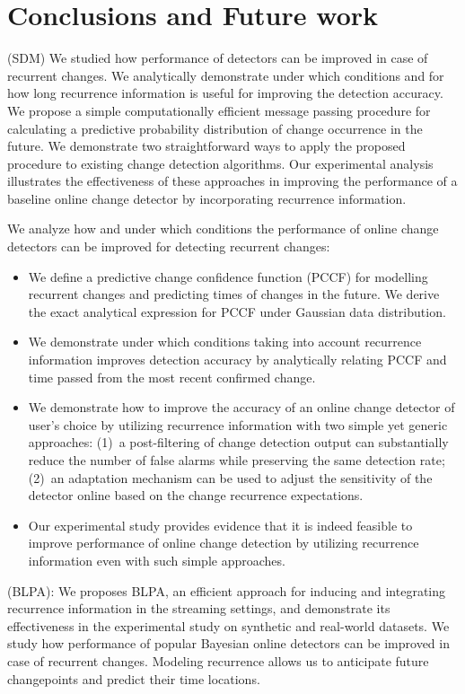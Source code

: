\chapter{Conclusions and Future work}

(SDM) We studied how performance of detectors can be improved in case of recurrent changes.
We analytically demonstrate under which conditions and for how long recurrence information is useful for improving the detection accuracy.
We propose a simple computationally efficient message passing procedure for calculating a predictive probability distribution of change occurrence in the future. We demonstrate two straightforward ways to apply the proposed procedure to existing change detection algorithms.
Our experimental analysis illustrates the effectiveness of these approaches in improving the performance of a baseline online change detector by incorporating recurrence information.

We analyze how and under which conditions the performance of online change detectors can be improved for detecting recurrent changes:
\begin{itemize}	\setlength\itemsep{0pt}
    \item We define a predictive change confidence function (PCCF) for modelling recurrent changes and predicting times of changes in the future. We derive the exact analytical expression for PCCF under Gaussian data distribution.
    \item We demonstrate under which conditions taking into account recurrence information improves detection accuracy by analytically relating PCCF and time passed from the most recent confirmed change.
    \item We demonstrate how to improve the accuracy of an online change detector of user's choice by utilizing recurrence information with two simple yet generic approaches: (1)~a post-filtering of change detection output can substantially reduce the number of false alarms while preserving the same detection rate; (2)~an adaptation mechanism can be used to adjust the sensitivity of the detector online based on the change recurrence expectations.
    \item Our experimental study provides evidence that it is indeed feasible to improve performance of online change detection by utilizing recurrence information even with such simple approaches.
\end{itemize}

(BLPA): 
We proposes BLPA, an efficient approach for inducing and integrating recurrence information in the streaming settings, and demonstrate its effectiveness in the experimental study on synthetic and real-world datasets.
We study how performance of popular Bayesian online detectors can be improved in case of recurrent changes. Modeling recurrence allows us to anticipate future changepoints and predict their time locations.

